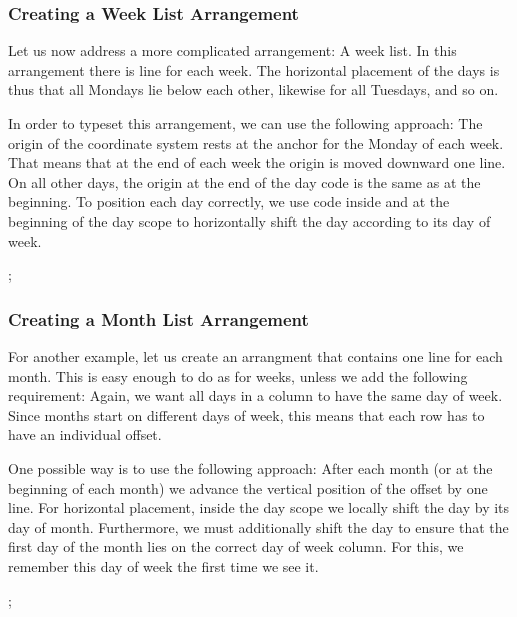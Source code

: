 \subsubsection{Creating a Week List Arrangement}

Let us now address a more complicated arrangement: A week list. In
this arrangement there is line for each week. The horizontal placement
of the days is thus that all Mondays lie below each other, likewise
for all Tuesdays, and so on.

In order to typeset this arrangement, we can use the following
approach: The origin of the coordinate system rests at the anchor for
the Monday of each week. That means that at the end of each week the
origin is moved downward one line. On all other days, the origin at
the end of the day code is the same as at the beginning. To position
each day correctly, we use code inside and at the beginning of the day
scope to horizontally shift the day according to its day of week. 
\begin{codeexample}[]
\tikz
  \calendar
    [dates=2000-01-01 to 2000-01-20,
     execute at begin day scope=
       {\pgftransformxshift{\pgfcalendarcurrentweekday em}},
     execute after day scope=
       {\ifdate{Sunday}{\pgftransformyshift{-1em}}{}}];
\end{codeexample}


\subsubsection{Creating a Month List Arrangement}

For another example, let us create an arrangment that contains one
line for each month. This is easy enough to do as for weeks, unless we
add the following requirement: Again, we want all days in a column to
have the same day of week. Since months start on different days of
week, this means that each row has to have an individual offset.

One possible way is to use the following approach: After each month
(or at the beginning of each month) we advance the vertical position
of the offset by one line. For horizontal placement, inside the day
scope we locally shift the day by its day of month. Furthermore, we
must additionally shift the day to ensure that the first day of the
month lies on the correct day of week column. For this, we remember
this day of week the first time we see it.
\begin{codeexample}[]
\newcount\mycount
\tikz
  \calendar
    [dates=2000-01-01 to 2000-02-last,
     execute before day scope=
     {
       \ifdate{day of month=1} {
         \mycount=\pgfcalendarcurrentweekday
         \pgftransformyshift{-1em}
       }{}
     },
     execute at begin day scope=
     {
       \pgftransformxshift{\pgfcalendarcurrentday em}
       \pgftransformxshift{\the\mycount em}
     }];
\end{codeexample}


